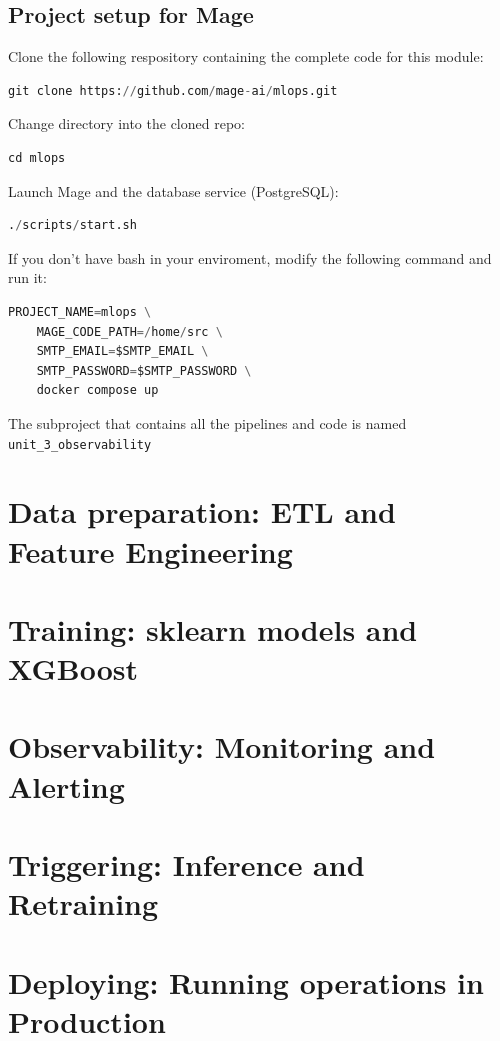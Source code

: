 \documentclass[letterpaper,12pt,notitlepage,twoside]{report}
\begin{document}
\subsection{Project setup for Mage}
Clone the following respository containing the complete code for this module:
\begin{lstlisting}[language=python, numbers=none]
git clone https://github.com/mage-ai/mlops.git
\end{lstlisting}

Change directory into the cloned repo:
\begin{lstlisting}[language=python, numbers=none]
cd mlops
\end{lstlisting}

Launch Mage and the database service (PostgreSQL):
\begin{lstlisting}[language=python, numbers=none]
./scripts/start.sh
\end{lstlisting}

If you don't have bash in your enviroment, modify the following command and run it:
\begin{lstlisting}[language=python, numbers=none]
PROJECT_NAME=mlops \
    MAGE_CODE_PATH=/home/src \
    SMTP_EMAIL=$SMTP_EMAIL \
    SMTP_PASSWORD=$SMTP_PASSWORD \
    docker compose up
\end{lstlisting}

The subproject that contains all the pipelines and code is named \texttt{unit\_3\_observability}

\section{Data preparation: ETL and Feature Engineering}
\section{Training: sklearn models and XGBoost}
\section{Observability: Monitoring and Alerting}
\section{Triggering: Inference and Retraining}
\section{Deploying: Running operations in Production}
\end{document}
